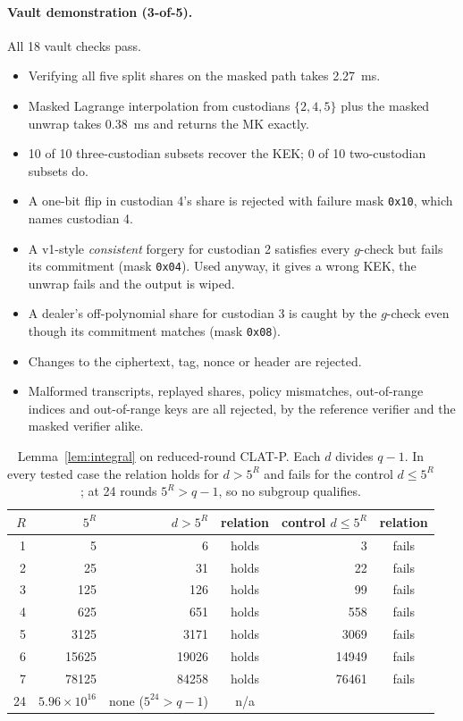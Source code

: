 \documentclass[10pt,a4paper]{article}
\newcommand{\code}[1]{\texttt{#1}}
\theoremstyle{definition}
\theoremstyle{remark}
\begin{document}
\paragraph{Vault demonstration (3-of-5).}
All 18 vault checks pass.
\begin{itemize}
  \item Verifying all five split shares on the masked path takes 2.27~ms.
  \item Masked Lagrange interpolation from custodians $\{2,4,5\}$ plus the masked unwrap takes 0.38~ms and returns the MK exactly.
  \item 10 of 10 three-custodian subsets recover the KEK; 0 of 10 two-custodian subsets do.
  \item A one-bit flip in custodian 4's share is rejected with failure mask \code{0x10}, which names custodian 4.
  \item A v1-style \emph{consistent} forgery for custodian 2 satisfies every $g$-check but fails its commitment (mask \code{0x04}). Used anyway, it gives a wrong KEK, the unwrap fails and the output is wiped.
  \item A dealer's off-polynomial share for custodian 3 is caught by the $g$-check even though its commitment matches (mask \code{0x08}).
  \item Changes to the ciphertext, tag, nonce or header are rejected.
  \item Malformed transcripts, replayed shares, policy mismatches, out-of-range indices and out-of-range keys are all rejected, by the reference verifier and the masked verifier alike.
\end{itemize}

\begin{table}[t]
\centering\small
\begin{tabular}{@{}rrrcrc@{}}
\toprule
$R$ & $5^R$ & $d > 5^R$ & relation & control $d \le 5^R$ & relation\\
\midrule
1 & 5 & 6 & holds & 3 & fails\\
2 & 25 & 31 & holds & 22 & fails\\
3 & 125 & 126 & holds & 99 & fails\\
4 & 625 & 651 & holds & 558 & fails\\
5 & 3125 & 3171 & holds & 3069 & fails\\
6 & 15625 & 19026 & holds & 14949 & fails\\
7 & 78125 & 84258 & holds & 76461 & fails\\
\midrule
24 & $5.96\times10^{16}$ & none ($5^{24} > q-1$) & n/a & & \\
\bottomrule
\end{tabular}
\caption{Lemma~\ref{lem:integral} on reduced-round CLAT-P. Each $d$ divides $q-1$. In every tested case the relation holds for $d > 5^R$ and fails for the control $d \le 5^R$; at 24 rounds $5^R > q-1$, so no subgroup qualifies.}\label{tab:degree}
\end{table}
\end{document}

